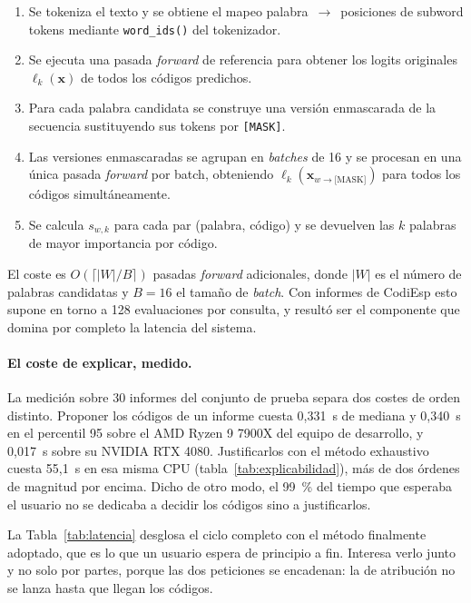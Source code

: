 \begin{enumerate}
 \item Se tokeniza el texto y se obtiene el mapeo palabra~$\to$~posiciones de subword tokens mediante \texttt{word\_ids()} del tokenizador.
 \item Se ejecuta una pasada \emph{forward} de referencia para obtener los logits originales $\ell_k(\mathbf{x})$ de todos los códigos predichos.
 \item Para cada palabra candidata se construye una versión enmascarada de la secuencia sustituyendo sus tokens por \texttt{[MASK]}.
 \item Las versiones enmascaradas se agrupan en \emph{batches} de 16 y se procesan en una única pasada \emph{forward} por batch, obteniendo $\ell_k(\mathbf{x}_{w \to \text{[MASK]}})$ para todos los códigos simultáneamente.
 \item Se calcula $s_{w,k}$ para cada par (palabra, código) y se devuelven las $k$ palabras de mayor importancia por código.
\end{enumerate}

El coste es $O(\lceil|W|/B\rceil)$ pasadas \emph{forward} adicionales, donde $|W|$ es el número de palabras candidatas y $B = 16$ el tamaño de \emph{batch}. Con informes de CodiEsp esto supone en torno a 128 evaluaciones por consulta, y resultó ser el componente que domina por completo la latencia del sistema.

\paragraph{El coste de explicar, medido.}
La medición sobre 30 informes del conjunto de prueba separa dos costes de orden distinto. Proponer los códigos de un informe cuesta 0{,}331~s de mediana y 0{,}340~s en el percentil 95 sobre el AMD Ryzen 9 7900X del equipo de desarrollo, y 0{,}017~s sobre su NVIDIA RTX 4080. Justificarlos con el método exhaustivo cuesta 55{,}1~s en esa misma CPU (tabla~\ref{tab:explicabilidad}), más de dos órdenes de magnitud por encima. Dicho de otro modo, el 99~\% del tiempo que esperaba el usuario no se dedicaba a decidir los códigos sino a justificarlos.

La Tabla~\ref{tab:latencia} desglosa el ciclo completo con el método finalmente adoptado, que es lo que un usuario espera de principio a fin. Interesa verlo junto y no solo por partes, porque las dos peticiones se encadenan: la de atribución no se lanza hasta que llegan los códigos.

